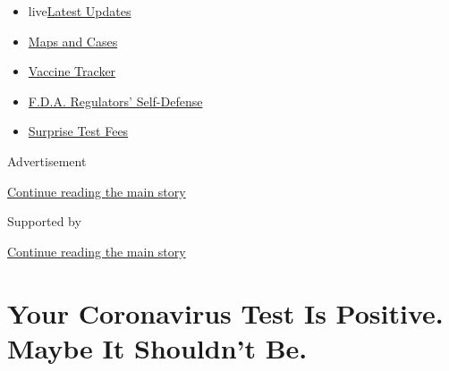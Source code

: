 \begin{itemize}
\tightlist
\item
  live\href{https://www.nytimes3xbfgragh.onion/2020/09/11/world/covid-19-coronavirus.html?name=styln-coronavirus-national\&region=TOP_BANNER\&block=storyline_menu_recirc\&action=click\&pgtype=Article\&impression_id=5b6288a0-f4ba-11ea-8f75-57b78e238649\&variant=undefined}{Latest
  Updates}
\item
  \href{https://www.nytimes3xbfgragh.onion/interactive/2020/us/coronavirus-us-cases.html?name=styln-coronavirus-national\&region=TOP_BANNER\&block=storyline_menu_recirc\&action=click\&pgtype=Article\&impression_id=5b6288a1-f4ba-11ea-8f75-57b78e238649\&variant=undefined}{Maps
  and Cases}
\item
  \href{https://www.nytimes3xbfgragh.onion/interactive/2020/science/coronavirus-vaccine-tracker.html?name=styln-coronavirus-national\&region=TOP_BANNER\&block=storyline_menu_recirc\&action=click\&pgtype=Article\&impression_id=5b6288a2-f4ba-11ea-8f75-57b78e238649\&variant=undefined}{Vaccine
  Tracker}
\item
  \href{https://www.nytimes3xbfgragh.onion/2020/09/10/us/politics/fda-coronavirus-vaccine.html?name=styln-coronavirus-national\&region=TOP_BANNER\&block=storyline_menu_recirc\&action=click\&pgtype=Article\&impression_id=5b6288a3-f4ba-11ea-8f75-57b78e238649\&variant=undefined}{F.D.A.
  Regulators' Self-Defense}
\item
  \href{https://www.nytimes3xbfgragh.onion/2020/09/09/upshot/coronavirus-surprise-test-fees.html?name=styln-coronavirus-national\&region=TOP_BANNER\&block=storyline_menu_recirc\&action=click\&pgtype=Article\&impression_id=5b6288a4-f4ba-11ea-8f75-57b78e238649\&variant=undefined}{Surprise
  Test Fees}
\end{itemize}

Advertisement

\protect\hyperlink{after-top}{Continue reading the main story}

Supported by

\protect\hyperlink{after-sponsor}{Continue reading the main story}

\hypertarget{your-coronavirus-test-is-positive-maybe-it-shouldnt-be}{%
\section{Your Coronavirus Test Is Positive. Maybe It Shouldn't
Be.}\label{your-coronavirus-test-is-positive-maybe-it-shouldnt-be}}

